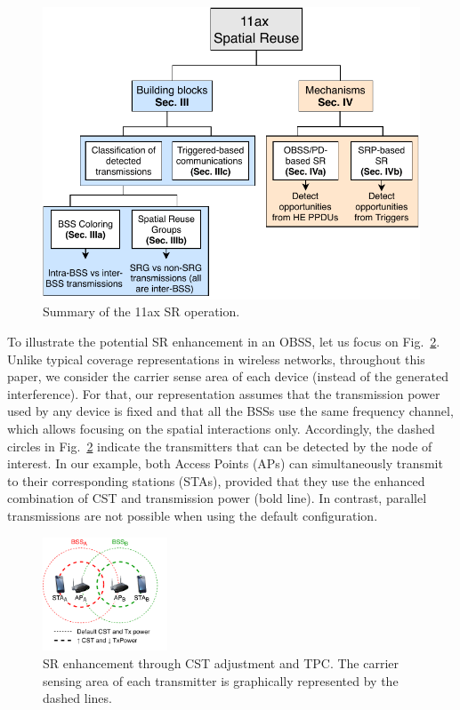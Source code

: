 \documentclass{ieeeaccess}
\begin{document}
\begin{figure}[ht!]
	\centering
	\includegraphics[width=\columnwidth]{sr_summary}
	\caption{Summary of the 11ax SR operation.}
	\label{fig:sr_summary}
\end{figure}

To illustrate the potential SR enhancement in an OBSS, let us focus on Fig.~\ref{fig:spatial_reuse_11ax}. Unlike typical coverage representations in wireless networks, throughout this paper, we consider the carrier sense area of each device (instead of the generated interference). For that, our representation assumes that the transmission power used by any device is fixed and that all the BSSs use the same frequency channel, which allows focusing on the spatial interactions only. Accordingly, the dashed circles in Fig.~\ref{fig:spatial_reuse_11ax} indicate the transmitters that can be detected by the node of interest. In our example, both Access Points (APs) can simultaneously transmit to their corresponding stations (STAs), provided that they use the enhanced combination of CST and transmission power (bold line). In contrast, parallel transmissions are not possible when using the default configuration.
\begin{figure}[ht!]
	\centering
	\includegraphics[width=0.33\textwidth]{fig_1.pdf}
	\caption{SR enhancement through CST adjustment and TPC. The carrier sensing area of each transmitter is graphically represented by the dashed lines.}
	\label{fig:spatial_reuse_11ax}
\end{figure}
\end{document}
